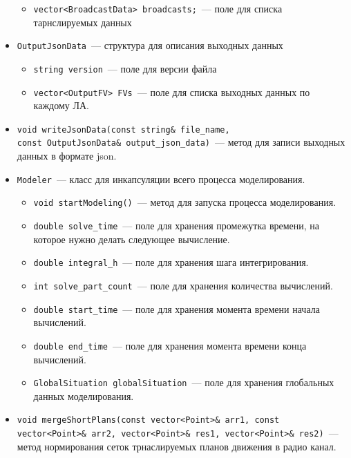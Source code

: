 \documentclass[a4paper,12pt]{article}
\numberwithin{figure}{subsubsection}
\begin{document}
\begin{itemize}
\begin{itemize}
        \item \texttt{vector<BroadcastData> broadcasts;}~--- поле для списка тарнслируемых данных
    \end{itemize}
    \item \texttt{OutputJsonData}~--- структура для описания выходных данных
    \begin{itemize}
        \item \texttt{string version}~--- поле для версии файла
        \item \texttt{vector<OutputFV> FVs}~--- поле для списка выходных данных по каждому ЛА.
    \end{itemize}
    \item \texttt{void writeJsonData(const string\& file\_name,\\ const OutputJsonData\& output\_json\_data)}~--- метод для записи выходных данных в формате json.
     \item \texttt{Modeler}~--- класс для инкапсуляции всего процесса моделирования.
    \begin{itemize}
        \item \texttt{void startModeling()}~---  метод для запуска процесса  моделирования.
        \item \texttt{double solve\_time}~--- поле для хранения промежутка времени, на которое нужно делать следующее вычисление.
        \item \texttt{double integral\_h}~--- поле для хранения шага интегрирования.
        \item \texttt{int solve\_part\_count}~--- поле для хранения количества вычислений.
        \item \texttt{double start\_time}~--- поле для хранения момента времени начала вычислений.
        \item \texttt{double end\_time}~--- поле для хранения момента времени конца вычислений.
        \item \texttt{GlobalSituation globalSituation}~--- поле для хранения глобальных данных моделирования.
    \end{itemize}
    \item \texttt{void mergeShortPlans(const vector<Point>\& arr1, const vector<Point>\& arr2,
	vector<Point>\& res1, vector<Point>\& res2)}~--- метод нормирования сеток трнаслируемых планов движения в радио канал.
\end{itemize}
\end{document}
